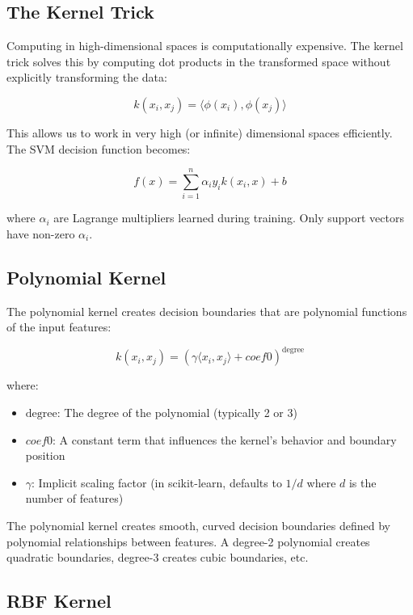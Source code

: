 \documentclass[12pt]{article}
\begin{document}
\subsection{The Kernel Trick}

Computing in high-dimensional spaces is computationally expensive. The kernel trick solves this by computing dot products in the transformed space without explicitly transforming the data:

\begin{equation}
k(x_i, x_j) = \langle \phi(x_i), \phi(x_j) \rangle
\end{equation}

This allows us to work in very high (or infinite) dimensional spaces efficiently. The SVM decision function becomes:

\begin{equation}
f(x) = \sum_{i=1}^{n} \alpha_i y_i k(x_i, x) + b
\end{equation}

where $\alpha_i$ are Lagrange multipliers learned during training. Only support vectors have non-zero $\alpha_i$.

\subsection{Polynomial Kernel}

The polynomial kernel creates decision boundaries that are polynomial functions of the input features:

\begin{equation}
k(x_i, x_j) = (\gamma \langle x_i, x_j \rangle + coef0)^{\text{degree}}
\end{equation}

where:
\begin{itemize}
    \item $\text{degree}$: The degree of the polynomial (typically 2 or 3)
    \item $coef0$: A constant term that influences the kernel's behavior and boundary position
    \item $\gamma$: Implicit scaling factor (in scikit-learn, defaults to $1/d$ where $d$ is the number of features)
\end{itemize}

The polynomial kernel creates smooth, curved decision boundaries defined by polynomial relationships between features. A degree-2 polynomial creates quadratic boundaries, degree-3 creates cubic boundaries, etc.

\subsection{RBF Kernel}
\end{document}

